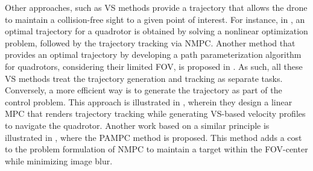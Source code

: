 Other approaches, such as  \Ac{VS} methods provide a trajectory that allows the drone to maintain a collision-free sight to a given point of interest. For instance, in \cite{target_aware}, an optimal trajectory for a quadrotor is obtained by solving a nonlinear optimization problem, followed by the trajectory tracking via \ac{NMPC}. Another method that provides an optimal trajectory by developing a path parameterization algorithm for quadrotors, considering their limited \ac{FOV}, is proposed in \cite{mit}. %
As such, all these \ac{VS} methods treat the trajectory generation and tracking as separate tasks. Conversely, a more efficient way is to generate the trajectory as part of the control problem. This approach is illustrated in \cite{VS_MPC}, %
wherein they design a linear MPC that renders trajectory tracking while generating {\ac{VS}}-based velocity profiles to navigate the quadrotor.
Another work based on a similar principle is illustrated in \cite{falanga2018pampc}, where the \ac{PAMPC} method is proposed. This method adds a cost to the problem formulation of \ac{NMPC} to maintain a target within the \ac{FOV}-center while minimizing image blur. %
